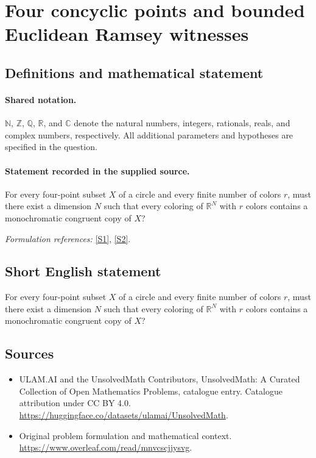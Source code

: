 \documentclass[11pt]{article}
\newcommand{\sref}[2]{\hyperlink{source:#1:#2}{[S#2]}}
\begin{document}
\section{Four concyclic points and bounded Euclidean Ramsey witnesses}\label{statement}

\subsection{Definitions and mathematical statement}

\paragraph{Shared notation.}$\mathbb N$, $\mathbb Z$, $\mathbb Q$, $\mathbb R$, and $\mathbb C$ denote the natural numbers, integers, rationals, reals, and complex numbers, respectively. All additional parameters and hypotheses are specified in the question.


\paragraph{Statement recorded in the supplied source.}
For every four-point subset $X$ of a circle and every finite number of colors $r$, must there exist a dimension $N$ such that every coloring of $\mathbb R^N$ with $r$ colors contains a monochromatic congruent copy of $X$?
\par\smallskip\textit{Formulation references:} \sref{statement}{1}, \sref{statement}{2}.
\subsection{Short English statement}
For every four-point subset $X$ of a circle and every finite number of colors $r$, must there exist a dimension $N$ such that every coloring of $\mathbb R^N$ with $r$ colors contains a monochromatic congruent copy of $X$?
\subsection{Sources}
\begin{itemize}
\item[\hypertarget{source:statement:1}{S1}] ULAM.AI and the UnsolvedMath Contributors, UnsolvedMath: A Curated Collection of Open Mathematics Problems, catalogue entry. Catalogue attribution under CC BY 4.0.
\url{https://huggingface.co/datasets/ulamai/UnsolvedMath}.
\item[\hypertarget{source:statement:2}{S2}] Original problem formulation and mathematical context.
\url{https://www.overleaf.com/read/mnvcscjjysvg}.
\end{itemize}
\label{end:statement}
\end{document}
